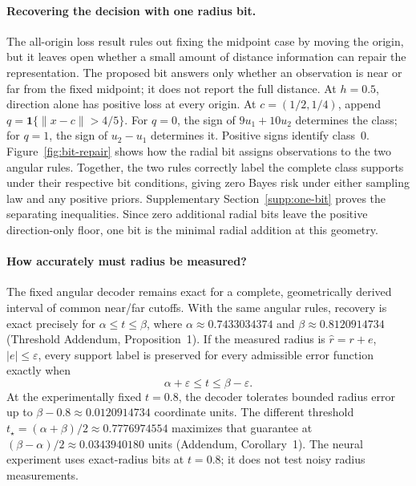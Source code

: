 \paragraph{Recovering the decision with one radius bit.}
The all-origin loss result rules out fixing the midpoint case by moving the origin, but it leaves open whether a small amount of distance information can repair the representation. The proposed bit answers only whether an observation is near or far from the fixed midpoint; it does not report the full distance. At $h=0.5$, direction alone has positive loss at every origin. At $c=(1/2,1/4)$, append $q=\mathbf1\{\|x-c\|>4/5\}$. For $q=0$, the sign of $9u_1+10u_2$ determines the class; for $q=1$, the sign of $u_2-u_1$ determines it. Positive signs identify class~0. Figure~\ref{fig:bit-repair} shows how the radial bit assigns observations to the two angular rules. Together, the two rules correctly label the complete class supports under their respective bit conditions, giving zero Bayes risk under either sampling law and any positive priors. Supplementary Section~\ref{supp:one-bit} proves the separating inequalities. Since zero additional radial bits leave the positive direction-only floor, one bit is the minimal radial addition at this geometry.

\paragraph{How accurately must radius be measured?}
The fixed angular decoder remains exact for a complete, geometrically derived interval of common near/far cutoffs. With the same angular rules, recovery is exact precisely for $\alpha\leq t\leq\beta$, where $\alpha\approx0.7433034374$ and $\beta\approx0.8120914734$ (Threshold Addendum, Proposition~1). If the measured radius is $\widehat r=r+e$, $|e|\leq\varepsilon$, every support label is preserved for every admissible error function exactly when
\begin{equation}
\alpha+\varepsilon\leq t\leq\beta-\varepsilon.
\label{eq:radius-error}
\end{equation}
At the experimentally fixed $t=0.8$, the decoder tolerates bounded radius error up to $\beta-0.8\approx0.0120914734$ coordinate units. The different threshold $t_\star=(\alpha+\beta)/2\approx0.7776974554$ maximizes that guarantee at $(\beta-\alpha)/2\approx0.0343940180$ units (Addendum, Corollary~1). The neural experiment uses exact-radius bits at $t=0.8$; it does not test noisy radius measurements.
